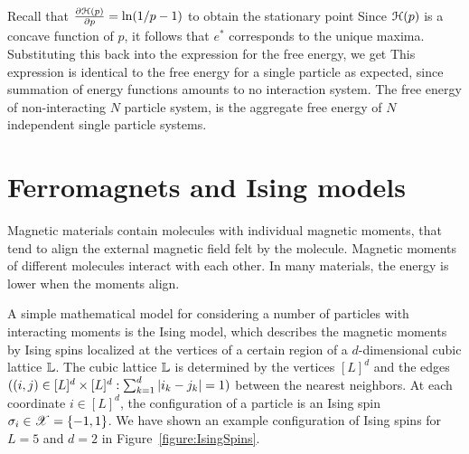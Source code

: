\documentclass[letterpaper,english,10pt]{article}
\begin{document}
\begin{shaded*}
\begin{exmp}
Recall that $\frac{\partial \mathcal{H}(p) }{\partial p} = \ln(1/p-1)$ to obtain the stationary point
Since $\mathcal{H}(p)$ is a concave function of $p$, it follows that $e^{\ast}$ corresponds to the unique maxima. %
Substituting this back into the expression for the free energy, we get 
This expression is identical to the free energy for a single particle as expected, 
since summation of energy functions amounts to no interaction system. 
The free energy of non-interacting $N$ particle system, is the aggregate free energy of $N$ independent single particle systems. 
\end{exmp}
\end{shaded*}

\section{Ferromagnets and Ising models}
Magnetic materials contain molecules with individual magnetic moments, that tend to align the external magnetic field felt by the molecule. 
Magnetic moments of different molecules interact with each other. 
In many materials, the energy is lower when the moments align. 

A simple mathematical model for considering a number of particles with interacting moments is the Ising model, which describes the magnetic moments by Ising spins localized at the vertices of a certain region of a $d$-dimensional cubic lattice $\mathbb{L}$. 
The cubic lattice $\mathbb{L}$ is determined by the vertices $[L]^d$ and the edges $((i,j) \in [L]^d \times [L]^d: \sum_{k=1}^d\left\lvert i_k-j_k\right\rvert = 1)$ between the nearest neighbors.  
At each coordinate $i \in [L]^d$, the configuration of a particle is an Ising spin $\sigma_i \in \mathscr{X} = \{-1,1\}$. 
We have shown an example configuration of Ising spins for $L=5$ and $d=2$ in Figure~\ref{figure:IsingSpins}. 
\end{document}
